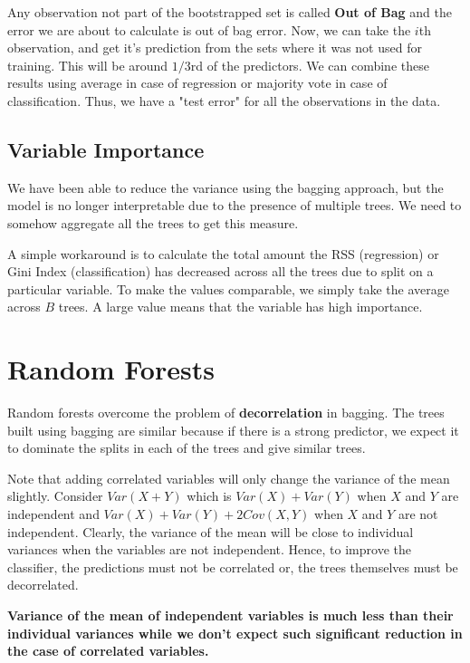\documentclass[../statistical_learning_notes.tex]{subfiles}
\begin{document}
    Any observation not part of the bootstrapped set is called \textbf{Out of Bag} and the error we are about to calculate is out of bag error. Now, we can take the $i$th observation, and get it's prediction from the sets where it was not used for training. This will be around $1/3$rd of the predictors. We can combine these results using average in case of regression or majority vote in case of classification. Thus, we have a "test error" for all the observations in the data.

    
    \subsection{Variable Importance}
    We have been able to reduce the variance using the bagging approach, but the model is no longer interpretable due to the presence of multiple trees. We need to somehow aggregate all the trees to get this measure.\newline

    A simple workaround is to calculate the total amount the RSS (regression) or Gini Index (classification) has decreased across all the trees due to split on a particular variable. To make the values comparable, we simply take the average across $B$ trees. A large value means that the variable has high importance.
    

    \section{Random Forests}
    Random forests overcome the problem of \textbf{decorrelation} in bagging. The trees built using bagging are similar because if there is a strong predictor, we expect it to dominate the splits in each of the trees and give similar trees.\newline
    
    Note that adding correlated variables will only change the variance of the mean slightly. Consider $Var(X + Y)$ which is $Var(X) + Var(Y)$ when $X$ and $Y$ are independent and $Var(X) + Var(Y) + 2Cov(X,Y)$ when $X$ and $Y$ are not independent. Clearly, the variance of the mean will be close to individual variances when the variables are not independent. Hence, to improve the classifier, the predictions must not be correlated or, the trees themselves must be decorrelated.\newline

    \textbf{Variance of the mean of independent variables is much less than their individual variances while we don't expect such significant reduction in the case of correlated variables.}\newline
\end{document}
